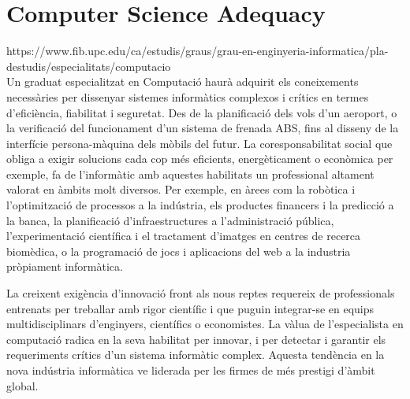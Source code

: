 
\chapter{Computer Science Adequacy} %

\label{Chapter4} %

https://www.fib.upc.edu/ca/estudis/graus/grau-en-enginyeria-informatica/pla-destudis/especialitats/computacio\\




Un graduat especialitzat en Computació haurà adquirit els coneixements necessàries per dissenyar sistemes informàtics complexos i crítics en termes d'eficiència, fiabilitat i seguretat. Des de la planificació dels vols d'un aeroport, o la verificació del funcionament d'un sistema de frenada ABS, fins al disseny de la interfície persona-màquina dels mòbils del futur. La coresponsabilitat social que obliga a exigir solucions cada cop més eficients, energèticament o econòmica per exemple, fa de l'informàtic amb aquestes habilitats un professional altament valorat en àmbits molt diversos. Per exemple, en àrees com la robòtica i l'optimització de processos a la indústria, els productes financers i la predicció a la banca, la planificació d'infraestructures a l'administració pública, l'experimentació científica i el tractament d'imatges en centres de recerca biomèdica, o la programació de jocs i aplicacions del web a la industria pròpiament informàtica.

La creixent exigència d'innovació front als nous reptes requereix de professionals entrenats per treballar amb rigor científic i que puguin integrar-se en equips multidisciplinars d'enginyers, científics o economistes. La vàlua de l'especialista en computació radica en la seva habilitat per innovar, i per detectar i garantir els requeriments crítics d'un sistema informàtic complex. Aquesta tendència en la nova indústria informàtica ve liderada per les firmes de més prestigi d'àmbit global.
